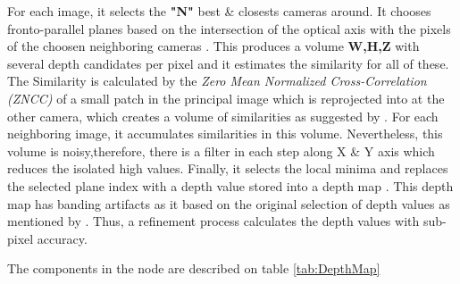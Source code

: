 \documentclass[12pt]{report}
\begin{document}
For each image, it selects the \textbf{"N"} best \& closests cameras around. It chooses fronto-parallel planes based on the intersection of the optical axis with the pixels of the choosen neighboring cameras .
This produces a volume \textbf{W,H,Z} with several depth candidates per pixel and it estimates the similarity for all of these. The Similarity is calculated by the \textit{Zero Mean Normalized Cross-Correlation (ZNCC)}
of a small patch in the principal image which is reprojected into at the other camera, which creates a volume of similarities as suggested by .
For each neighboring image, it accumulates similarities in this volume. Nevertheless, this volume is noisy,therefore,  there is a filter in each step along X \& Y axis which reduces the isolated high values.
Finally, it selects the local minima and replaces the selected plane index with a depth value stored into a depth map . This depth map has banding artifacts as it based on the original selection of depth values as mentioned by .
Thus, a refinement process calculates the depth values with sub-pixel accuracy.

The components in the node are described on table \ref{tab:DepthMap}
\end{document}
